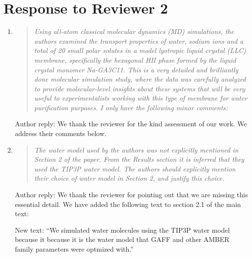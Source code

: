 \documentclass{article}
\begin{document}
\section*{Response to Reviewer 2}

\begin{enumerate}
	
	\item \begin{quote} \textit{Using all-atom classical molecular dynamics (MD) simulations,
	the authors examined the transport properties of water, sodium ions and a total of 20 
	small polar solutes in a model lyotropic liquid crystal (LLC) membrane, specifically the
	hexagonal HII phase formed by the liquid crystal monomer Na-GA3C11. This is a very 
	detailed and brilliantly done molecular simulation study, where the data was carefully 
	analyzed to provide molecular-level insights about these systems that will be very 
	useful to experimentalists working with this type of membrane for water purification 
	purposes. I only have the following minor comments: }\end{quote}
	
	Author reply: We thank the reviewer for the kind assessment of our work. We address their
	comments below.
	
	\item \begin{quote}
	
	\textit{The water model used by the authors was not explicitly mentioned in Section 2 
	of the paper. From the Results section it is inferred that they used the TIP3P water model.
	The authors should explicitly mention their choice of water model in Section 2, and 
	justify this choice.}
	
	\end{quote}
	
	Author reply: We thank the reviewer for pointing out that we are missing this essential detail.
	We have added the following text to section 2.1 of the main text:

	New text: ``We simulated water molecules using the TIP3P water model because it 
	because it is the water model that GAFF and other AMBER family parameters were optmized with.''

    

\end{enumerate}
\end{document}
